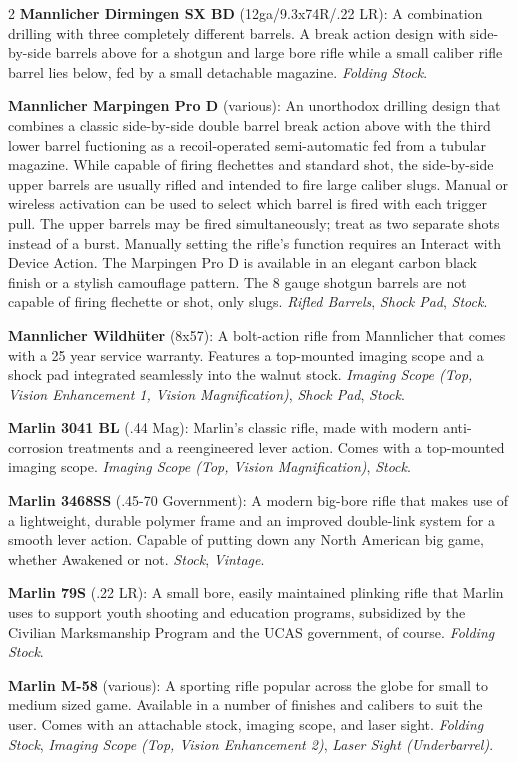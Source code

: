 \documentclass[
  oneside]{article}
\begin{document}
\begin{multicols}{2}
\textbf{Mannlicher Dirmingen SX BD}
(12ga/9.3x74R/.22 LR): A combination drilling with
three completely different barrels. A break action
design with side-by-side barrels above for a
shotgun and large bore rifle while a small caliber
rifle barrel lies below, fed by a small detachable
magazine. \emph{Folding Stock}.

\textbf{Mannlicher Marpingen Pro D} (various): An
unorthodox drilling design that combines a classic
side-by-side double barrel break action above with
the third lower barrel fuctioning as a
recoil-operated semi-automatic fed from a tubular
magazine. While capable of firing flechettes and
standard shot, the side-by-side upper barrels are
usually rifled and intended to fire large caliber
slugs. Manual or wireless activation can be used
to select which barrel is fired with each trigger
pull. The upper barrels may be fired
simultaneously; treat as two separate shots
instead of a burst. Manually setting the rifle's
function requires an Interact with Device Action.
The Marpingen Pro D is available in an elegant
carbon black finish or a stylish camouflage
pattern. The 8 gauge shotgun barrels are not
capable of firing flechette or shot, only slugs.
\emph{Rifled Barrels}, \emph{Shock Pad},
\emph{Stock}.

\textbf{Mannlicher Wildhüter} (8x57): A
bolt-action rifle from Mannlicher that comes with
a 25 year service warranty. Features a top-mounted
imaging scope and a shock pad integrated
seamlessly into the walnut stock. \emph{Imaging
Scope (Top, Vision Enhancement 1, Vision
Magnification)}, \emph{Shock Pad}, \emph{Stock}.

\textbf{Marlin 3041 BL} (.44 Mag): Marlin's
classic rifle, made with modern anti-corrosion
treatments and a reengineered lever action. Comes
with a top-mounted imaging scope. \emph{Imaging
Scope (Top, Vision Magnification)}, \emph{Stock}.

\textbf{Marlin 3468SS} (.45-70 Government): A
modern big-bore rifle that makes use of a
lightweight, durable polymer frame and an improved
double-link system for a smooth lever action.
Capable of putting down any North American big
game, whether Awakened or not. \emph{Stock},
\emph{Vintage}.

\textbf{Marlin 79S} (.22 LR): A small bore, easily
maintained plinking rifle that Marlin uses to
support youth shooting and education programs,
subsidized by the Civilian Marksmanship Program
and the UCAS government, of course. \emph{Folding
Stock}.

\textbf{Marlin M-58} (various): A sporting rifle
popular across the globe for small to medium sized
game. Available in a number of finishes and
calibers to suit the user. Comes with an
attachable stock, imaging scope, and laser sight.
\emph{Folding Stock}, \emph{Imaging Scope (Top,
Vision Enhancement 2)}, \emph{Laser Sight
(Underbarrel)}.


\end{multicols}
\end{document}
